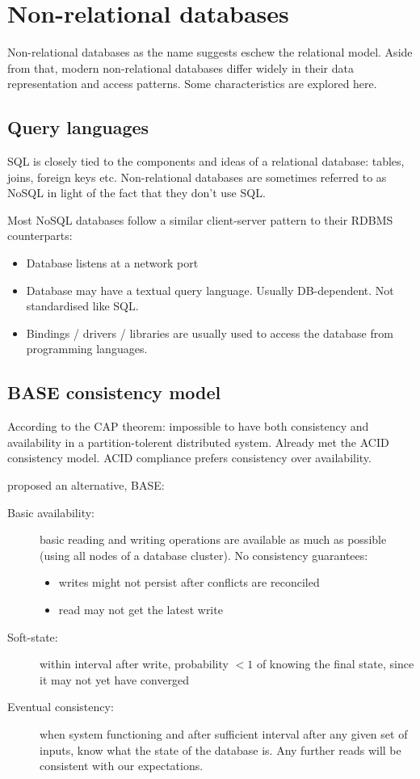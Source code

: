 \documentclass{pgnotes}
\begin{document}
\section{Non-relational databases}

Non-relational databases as the name suggests eschew the relational model.
Aside from that, modern non-relational databases differ widely in their data representation and access patterns.
Some characteristics are explored here.


\subsection{Query languages}

SQL is closely tied to the components and ideas of a relational database: tables, joins, foreign keys etc.
Non-relational databases are sometimes referred to as NoSQL in light of the fact that they don't use SQL. 

Most NoSQL databases follow a similar client-server pattern to their RDBMS counterparts:
\begin{itemize}
\item Database listens at a network port
\item Database may have a textual query language. Usually DB-dependent. Not standardised like SQL.
\item Bindings / drivers / libraries are usually used to access the database from programming languages.
\end{itemize}

\subsection{BASE consistency model}

According to the CAP theorem: impossible to have both consistency and availability in a partition-tolerent distributed system.
Already met the ACID consistency model.
ACID compliance prefers consistency over availability.

\citet{pritchett:2008:base} proposed an alternative, BASE:

\begin{description}
\item[Basic availability:]
  basic reading and writing operations are available as much as possible (using all nodes of a database cluster). No consistency guarantees:
    \begin{itemize}
    \item writes might not persist after conflicts are reconciled
    \item read may not get the latest write
    \end{itemize}
  \item[Soft-state:] within interval after write, probability $<1$ of knowing the final state, since it may not yet have converged
  \item[Eventual consistency:] when system functioning and after sufficient interval after any given set of inputs, know what the state of the database is. Any further reads will be consistent with our expectations. 
\end{description}
\end{document}
